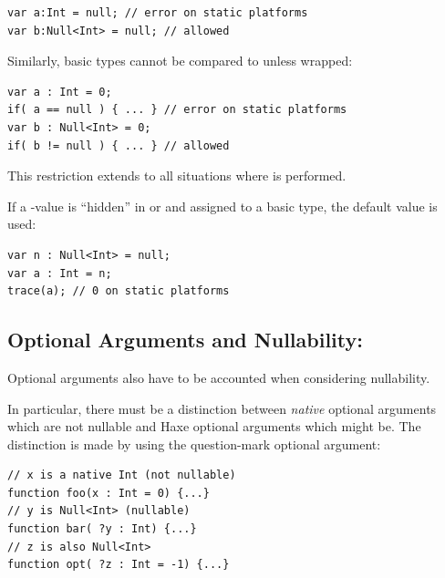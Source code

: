 \documentclass{haxe}
\begin{document}
\begin{lstlisting}
var a:Int = null; // error on static platforms
var b:Null<Int> = null; // allowed
\end{lstlisting}
Similarly, basic types cannot be compared to  unless wrapped:

\begin{lstlisting}
var a : Int = 0;
if( a == null ) { ... } // error on static platforms
var b : Null<Int> = 0;
if( b != null ) { ... } // allowed
\end{lstlisting}
This restriction extends to all situations where  is performed.

If a -value is ``hidden'' in  or  and assigned to a basic type, the default value is used:

\begin{lstlisting}
var n : Null<Int> = null;
var a : Int = n;
trace(a); // 0 on static platforms
\end{lstlisting}

\subsection{Optional Arguments and Nullability:}
\label{types-nullability-optional-arguments}

Optional arguments also have to be accounted when considering nullability.

In particular, there must be a distinction between \emph{native} optional arguments which are not nullable and Haxe optional arguments which might be.  The distinction is made by using the question-mark optional argument:

\begin{lstlisting}
// x is a native Int (not nullable)
function foo(x : Int = 0) {...}
// y is Null<Int> (nullable)
function bar( ?y : Int) {...}
// z is also Null<Int>
function opt( ?z : Int = -1) {...}
\end{lstlisting}

\end{document}
